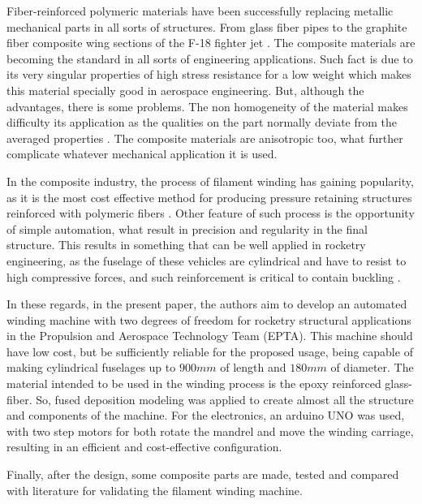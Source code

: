 \documentclass[10pt,fleqn,a4paper,twoside]{article}
\begin{document}
Fiber-reinforced polymeric materials have been successfully replacing metallic mechanical parts in all sorts of structures. From glass fiber pipes to the graphite fiber composite wing sections of the F-18 fighter jet \citep{vari_bobi}. The composite materials are becoming the standard in all sorts of engineering applications. Such fact is due to its very singular properties of high stress resistance for a low weight \citep{bobinamento} which makes this material specially good in aerospace engineering.
But, although the advantages, there is some problems. The non homogeneity of the material makes difficulty its application as the qualities on the part normally deviate from the averaged properties \citep{utilizacaoi}. The composite materials are anisotropic too, what further complicate whatever mechanical application it is used.      

In the composite industry, the process of filament winding has gaining popularity, as it is the most cost effective method for producing pressure retaining structures reinforced with polymeric fibers \citep{influence_tension}. Other feature of such process is the opportunity of simple automation, what result in precision and regularity in the final structure. This results in something that can be well applied in rocketry engineering, as the fuselage of these vehicles are cylindrical and have to resist to high compressive forces, and such reinforcement is critical to contain buckling \citep{rocket_tube}. 

In these regards, in the present paper, the authors aim to develop an automated winding machine with two degrees of freedom for rocketry structural applications in the Propulsion and Aerospace Technology Team (EPTA). 
This machine should have low cost, but be sufficiently reliable for the proposed usage, being capable of making cylindrical fuselages up to $900 mm$ of length and $180 mm$ of diameter. The material intended to be used in the winding process is the epoxy reinforced glass-fiber. So, fused deposition modeling was applied to create almost all the structure and components of the machine. For the electronics, an arduino UNO was used, with two step motors for both rotate the mandrel and move the winding carriage, resulting in an efficient and cost-effective configuration. 

Finally, after the design, some composite parts are made, tested and compared with literature \citep{ensaio_artigo} for validating the filament winding machine.
\end{document}
